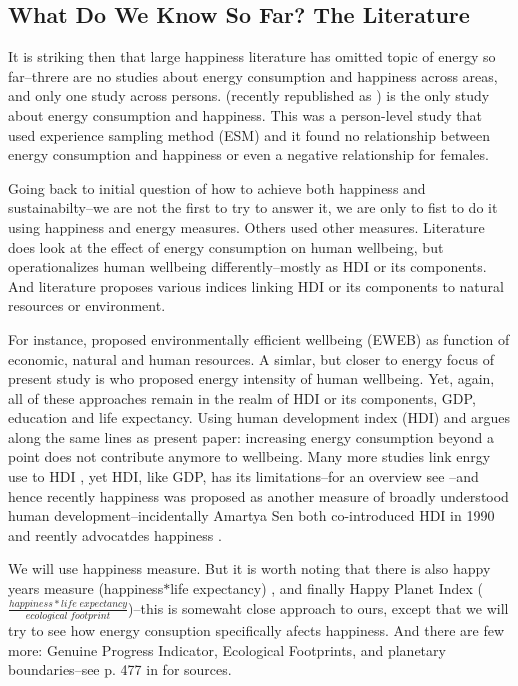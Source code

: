 \documentclass[10pt, letterpaper]{article}
\begin{document}
\begin{spacing}{1.4}
\section{What Do We Know So Far? The Literature}

It is striking then that large happiness literature has omitted topic of energy
so far--threre are no studies about energy consumption and happiness across
areas, and only one study across persons.  \citet{graef81} (recently republished
as \citet{csikszentmihalyi14}) is the  only study about energy consumption and
happiness. This was a person-level study that used experience
sampling method (ESM) and it found no relationship between energy consumption
and happiness or even a negative relationship for females. 

Going back to initial question of how to achieve both happiness and
sustainabilty--we are not the first to try to answer it, we are only to fist to
do it using happiness and energy measures. Others used other measures.
Literature does look at the effect of energy consumption on human
wellbeing, but operationalizes human wellbeing differently--mostly as HDI or its
components. And literature proposes various indices linking HDI or its
components to natural resources or environment.

For instance, \citet{dietz09} proposed environmentally efficient wellbeing
(EWEB) as function of economic, natural and human resources. A simlar, but
closer to energy focus of present study is \citet{jorgenson14B} who proposed
energy intensity of human wellbeing. Yet, again, all of these approaches remain
in the realm of HDI or its components, GDP, education and life expectancy. 
 Using human development index (HDI) \citep{steinberger10} and argues along the
 same lines as present paper: increasing energy consumption beyond a point does
 not contribute anymore to wellbeing.  Many more studies link enrgy use to HDI
 \citep[e.g.]{dias06}, yet HDI, like  GDP, has its limitations--for an overview
 see \citet{klugman11}--and hence  recently happiness was proposed as another
 measure of broadly understood human  development--incidentally Amartya Sen both
 co-introduced HDI in 1990 and  reently advocatdes happiness \citep{stiglitz09al}. 

We will use happiness measure. But it is worth noting that there is also
 happy years measure (happiness$*$life expectancy) \citep{veenhoven96B}, and
 finally Happy Planet Index ($\frac{happiness*life\;expectancy}{ecological\;footprint}$)--this is somewaht close approach to  ours, except that we will try to see how energy consuption specifically afects  happiness. And there are few more: Genuine Progress Indicator, Ecological Footprints,  and planetary boundaries--see p. 477 in \citet{pretty13} for  sources. 


\end{spacing}
\end{document}
